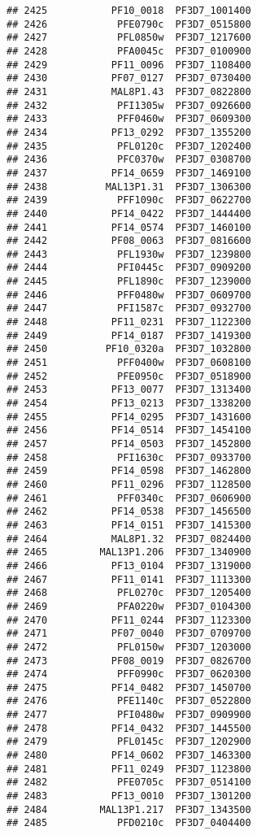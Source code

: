 \documentclass{article}\usepackage[]{graphicx}\usepackage[]{color}
\makeatletter
\newenvironment{kframe}{%
 \def\at@end@of@kframe{}%
 \ifinner\ifhmode%
  \def\at@end@of@kframe{\end{minipage}}%
  \begin{minipage}{\columnwidth}%
 \fi\fi%
 \def\FrameCommand##1{\hskip\@totalleftmargin \hskip-\fboxsep
 \colorbox{shadecolor}{##1}\hskip-\fboxsep
     \hskip-\linewidth \hskip-\@totalleftmargin \hskip\columnwidth}%
 \MakeFramed {\advance\hsize-\width
   \@totalleftmargin\z@ \linewidth\hsize
   \@setminipage}}%
 {\par\unskip\endMakeFramed%
 \at@end@of@kframe}
\newenvironment{knitrout}{}{} %
\makeatother
\begin{document}
\begin{knitrout}
\begin{kframe}
\begin{verbatim}
## 2425           PF10_0018  PF3D7_1001400
## 2426            PFE0790c  PF3D7_0515800
## 2427            PFL0850w  PF3D7_1217600
## 2428            PFA0045c  PF3D7_0100900
## 2429           PF11_0096  PF3D7_1108400
## 2430           PF07_0127  PF3D7_0730400
## 2431           MAL8P1.43  PF3D7_0822800
## 2432            PFI1305w  PF3D7_0926600
## 2433            PFF0460w  PF3D7_0609300
## 2434           PF13_0292  PF3D7_1355200
## 2435            PFL0120c  PF3D7_1202400
## 2436            PFC0370w  PF3D7_0308700
## 2437           PF14_0659  PF3D7_1469100
## 2438          MAL13P1.31  PF3D7_1306300
## 2439            PFF1090c  PF3D7_0622700
## 2440           PF14_0422  PF3D7_1444400
## 2441           PF14_0574  PF3D7_1460100
## 2442           PF08_0063  PF3D7_0816600
## 2443            PFL1930w  PF3D7_1239800
## 2444            PFI0445c  PF3D7_0909200
## 2445            PFL1890c  PF3D7_1239000
## 2446            PFF0480w  PF3D7_0609700
## 2447            PFI1587c  PF3D7_0932700
## 2448           PF11_0231  PF3D7_1122300
## 2449           PF14_0187  PF3D7_1419300
## 2450          PF10_0320a  PF3D7_1032800
## 2451            PFF0400w  PF3D7_0608100
## 2452            PFE0950c  PF3D7_0518900
## 2453           PF13_0077  PF3D7_1313400
## 2454           PF13_0213  PF3D7_1338200
## 2455           PF14_0295  PF3D7_1431600
## 2456           PF14_0514  PF3D7_1454100
## 2457           PF14_0503  PF3D7_1452800
## 2458            PFI1630c  PF3D7_0933700
## 2459           PF14_0598  PF3D7_1462800
## 2460           PF11_0296  PF3D7_1128500
## 2461            PFF0340c  PF3D7_0606900
## 2462           PF14_0538  PF3D7_1456500
## 2463           PF14_0151  PF3D7_1415300
## 2464           MAL8P1.32  PF3D7_0824400
## 2465         MAL13P1.206  PF3D7_1340900
## 2466           PF13_0104  PF3D7_1319000
## 2467           PF11_0141  PF3D7_1113300
## 2468            PFL0270c  PF3D7_1205400
## 2469            PFA0220w  PF3D7_0104300
## 2470           PF11_0244  PF3D7_1123300
## 2471           PF07_0040  PF3D7_0709700
## 2472            PFL0150w  PF3D7_1203000
## 2473           PF08_0019  PF3D7_0826700
## 2474            PFF0990c  PF3D7_0620300
## 2475           PF14_0482  PF3D7_1450700
## 2476            PFE1140c  PF3D7_0522800
## 2477            PFI0480w  PF3D7_0909900
## 2478           PF14_0432  PF3D7_1445500
## 2479            PFL0145c  PF3D7_1202900
## 2480           PF14_0602  PF3D7_1463300
## 2481           PF11_0249  PF3D7_1123800
## 2482            PFE0705c  PF3D7_0514100
## 2483           PF13_0010  PF3D7_1301200
## 2484         MAL13P1.217  PF3D7_1343500
## 2485            PFD0210c  PF3D7_0404400

\end{verbatim}
\end{kframe}
\end{knitrout}
\end{document}
